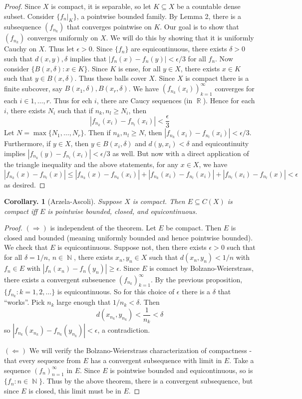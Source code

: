 \documentclass[11pt, a4paper]{memoir}
\DeclareMathOperator{\N}{{\mathbb{N}}}
\DeclareMathOperator{\R}{{\mathbb{R}}}
\theoremstyle{change}
\newtheorem{corollary}[theorem]{Corollary.}
\theoremstyle{plain}
\theoremstyle{nonumberplain}
\newtheorem{proof}{Proof}
\numberwithin{equation}{section}
\begin{document}
\begin{proof}
    Since $X$ is compact, it is separable, so let $K\subseteq X$ be a countable dense subset.
    Consider $\{f_n|_K\}$, a pointwise bounded family.
    By Lemma 2, there is a subsequence $(f_{n_k})$ that converges pointwise on $K$.
    Our goal is to show that $(f_{n_k})$ converges uniformly on $X$.
    We will do this by showing that it is uniformly Cauchy on $X$.
    Thus let $\epsilon>0$.
    Since $\{f_n\}$ are equicontinuous, there exists $\delta>0$ such that $d(x,y),\delta$ implies that $|f_n(x)-f_n(y)|<\epsilon/3$ for all $f_n$.
    Now consider $\{B(x,\delta):x\in K\}$.
    Since $K$ is ense, for all $y\in X$, there exists $x\in K$ such that $y\in B(x,\delta)$.
    Thus these balls cover $X$.
    Since $X$ is compact there is a finite subcover, say $B(x_1,\delta),B(x_r,\delta)$.
    We have $(f_{n_k}(x_i))_{k=1}^\infty$ converges for each $i\in 1,\ldots,r$.
    Thus for ech $i$, there are Caucy sequences (in $\R$).
    Hence for each $i$, there exists $N_i$ such that if $n_k,n_l\geq N_i$, then
    \[|f_{n_k}(x_i)-f_{n_l}(x_i)|<\frac{\epsilon}{3}\]
    Let $N=\max\{N_1,\ldots,N_r\}$.
    Then if $n_k,n_l\geq N$, then $|f_{n_k}(x_i)-f_{n_l}(x_i)|<\epsilon/3$.
    Furthermore, if $y\in X$, then $y\in B(x_i,\delta)$ and $d(y,x_i)<\delta$ and equicontinuity implies $|f_{n_k}(y)-f_{n_l}(x_i)|<\epsilon/3$ as well.
    But now with a direct application of the triangle inequality and the above statements, for any $x\in X$, we have
    \[|f_{n_k}(x)-f_{n_l}(x)|\leq |f_{n_k}(x)-f_{n_k}(x_i)|+|f_{n_k}(x_i)-f_{n_l}(x_i)|+|f_{n_l}(x_i)-f_{n_l}(x)|<\epsilon\]
    as desired.
\end{proof}
\begin{corollary}[Arzela-Ascoli]
    Suppose $X$ is compact.
    Then $E\subseteq C(X)$ is compact iff $E$ is pointwise bounded, closed, and equicontinuous.
\end{corollary}
\begin{proof}
    $(\Rightarrow)$ is independent of the theorem.
    Let $E$ be compact.
    Then $E$ is closed and bounded (meaning uniformly bounded and hence pointwise bounded).
    We check that $E$ is equicontinuous.
    Suppose not, then there exists $\epsilon>0$ such that for all $\delta=1/n$, $n\in\N$, there exists $x_n,y_n\in X$ such that $d(x_n,y_n)<1/n$ with $f_n\in E$ with $|f_n(x_n)-f_n(y_n)|\geq\epsilon$.
    Since $E$ is comact by Bolzano-Weierstrass, there exists a convergent subseuence $(f_{n_k})_{k=1}^\infty$.
    By the previous proposition, $\{f_{n_k}:k=1,2,\ldots\}$ is equicontinuous.
    So for this choice of $\epsilon$ there is a $\delta$ that ``works''. Pick $n_k$ large enough that $1/n_k<\delta$. Then
    \[d(x_{n_k},y_{n_k})<\frac{1}{n_k}<\delta\]
    so $|f_{n_k}(x_{n_k})-f_{n_k}(y_{n_k})|<\epsilon$, a contradiction.

    $(\Leftarrow)$ We will verify the Bolzano-Weierstrass characterization of compactness - that every sequence from $E$ has a convergent subsequence with limit in $E$.
    Take a sequence $(f_n)_{n=1}^\infty$ in $E$.
    Since $E$ is pointwise bounded and equicontinuous, so is $\{f_n:n\in\N\}$.
    Thus by the above theorem, there is a convergent subsequence, but since $E$ is closed, this limit must be in $E$.
\end{proof}
\end{document}
